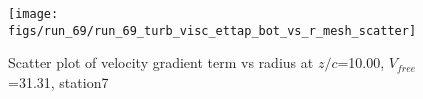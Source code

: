 \begin{figure}[H]
\centering
\texttt{[image: figs/run\_69/run\_69\_turb\_visc\_ettap\_bot\_vs\_r\_mesh\_scatter]}
\caption{Scatter plot of velocity gradient term vs radius at $z/c$=10.00, $V_{free}$=31.31, station7}
\label{fig:run_69_turb_visc_ettap_bot_vs_r_mesh_scatter}
\end{figure}


